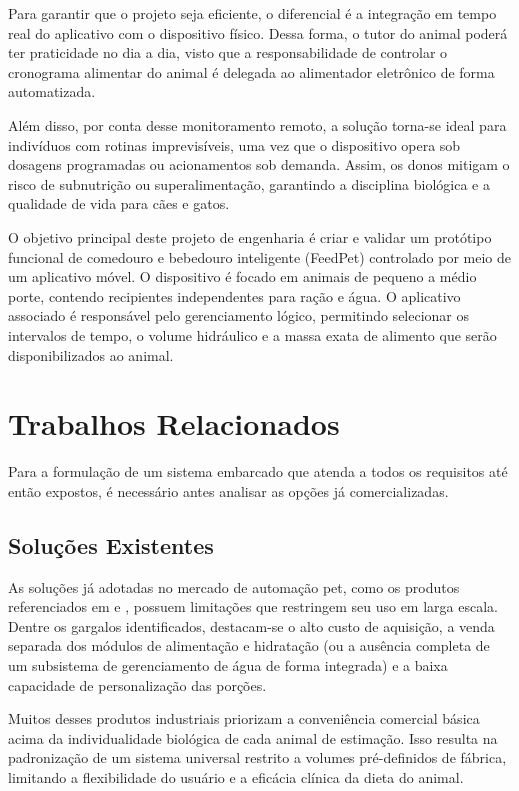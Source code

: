 \documentclass[12pt]{article}
\begin{document}
Para garantir que o projeto seja eficiente, o diferencial é a integração em tempo real do aplicativo com o dispositivo físico. Dessa forma, o tutor do animal poderá ter praticidade no dia a dia, visto que a responsabilidade de controlar o cronograma alimentar do animal é delegada ao alimentador eletrônico de forma automatizada. 

Além disso, por conta desse monitoramento remoto, a solução torna-se ideal para indivíduos com rotinas imprevisíveis, uma vez que o dispositivo opera sob dosagens programadas ou acionamentos sob demanda. Assim, os donos mitigam o risco de subnutrição ou superalimentação, garantindo a disciplina biológica e a qualidade de vida para cães e gatos.

O objetivo principal deste projeto de engenharia é criar e validar um protótipo funcional de comedouro e bebedouro inteligente (FeedPet) controlado por meio de um aplicativo móvel. O dispositivo é focado em animais de pequeno a médio porte, contendo recipientes independentes para ração e água. O aplicativo associado é responsável pelo gerenciamento lógico, permitindo selecionar os intervalos de tempo, o volume hidráulico e a massa exata de alimento que serão disponibilizados ao animal.

\section{Trabalhos Relacionados}

Para a formulação de um sistema embarcado que atenda a todos os requisitos até então expostos, é necessário antes analisar as opções já comercializadas.

\subsection{Soluções Existentes}
As soluções já adotadas no mercado de automação pet, como os produtos referenciados em \cite{onizoomi:26} e \cite{surecare:26}, possuem limitações que restringem seu uso em larga escala. Dentre os gargalos identificados, destacam-se o alto custo de aquisição, a venda separada dos módulos de alimentação e hidratação (ou a ausência completa de um subsistema de gerenciamento de água de forma integrada) e a baixa capacidade de personalização das porções. 

Muitos desses produtos industriais priorizam a conveniência comercial básica acima da individualidade biológica de cada animal de estimação. Isso resulta na padronização de um sistema universal restrito a volumes pré-definidos de fábrica, limitando a flexibilidade do usuário e a eficácia clínica da dieta do animal.
\end{document}
